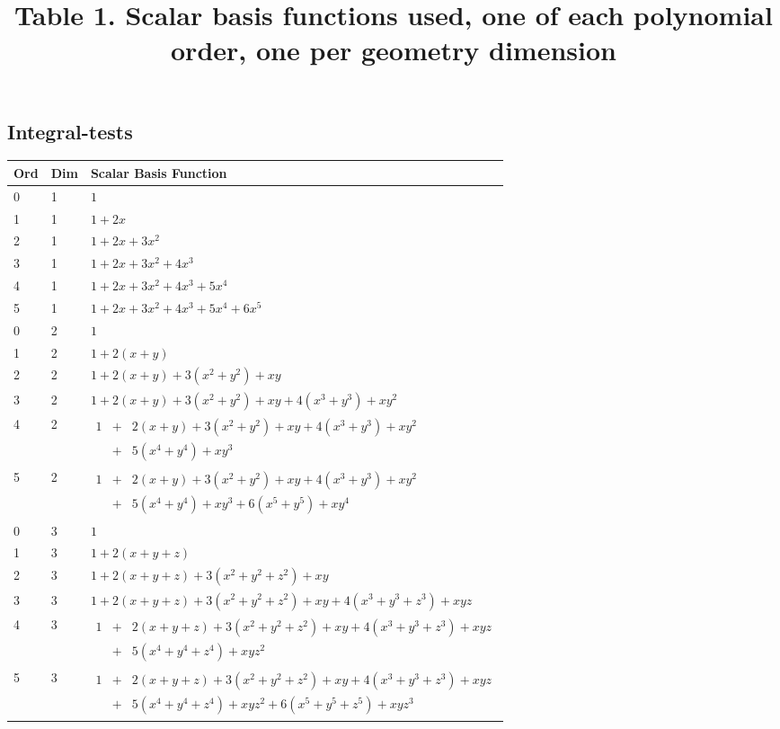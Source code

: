 \subsection{Integral-tests}

\begin{center}
\begin{tabular}{ | l | l | l |}
  \hline
  Ord & Dim & Scalar Basis Function \\ \hline
  0 & 1 & $1$ \\ \hline
  1 & 1 & $1 + 2x$ \\ \hline
  2 & 1 & $1 + 2x + 3x^2$ \\ \hline
  3 & 1 & $1 + 2x + 3x^2 + 4x^3$ \\ \hline
  4 & 1 & $1 + 2x + 3x^2 + 4x^3 + 5x^4$ \\ \hline
  5 & 1 & $1 + 2x + 3x^2 + 4x^3 + 5x^4 + 6x^5$ \\ \hline
  0 & 2 & $1$ \\ \hline
  1 & 2 & $1 + 2(x + y)$ \\ \hline
  2 & 2 & $1 + 2(x + y) + 3(x^2 + y^2) + xy$ \\ \hline
  3 & 2 & $1 + 2(x + y) + 3(x^2 + y^2) + xy + 4(x^3 + y^3) + xy^2$ \\ \hline
  4 & 2 & $\begin{array}{lcl} 1 & + & 2(x + y) + 3(x^2 + y^2) + xy + 4(x^3 + y^3) + xy^2 \\ & + & 5(x^4 + y^4) + xy^3 \end{array}$ \\ \hline
  5 & 2 & $\begin{array}{lcl} 1 & + & 2(x + y) + 3(x^2 + y^2) + xy + 4(x^3 + y^3) + xy^2 \\ & + & 5(x^4 + y^4) + xy^3 + 6(x^5 + y^5) + xy^4 \end{array}$ \\ \hline
  0 & 3 & $1$ \\ \hline
  1 & 3 & $1 + 2(x + y + z)$ \\ \hline
  2 & 3 & $1 + 2(x + y + z) + 3(x^2 + y^2 + z^2) + xy$ \\ \hline
  3 & 3 & $1 + 2(x + y + z) + 3(x^2 + y^2 + z^2) + xy + 4(x^3 + y^3 + z^3) + xyz$ \\ \hline
  4 & 3 & $\begin{array}{lcl} 1 & + & 2(x + y + z) + 3(x^2 + y^2 + z^2) + xy + 4(x^3 + y^3 + z^3) + xyz \\ & + & 5(x^4 + y^4 + z^4) + xyz^2 \end{array}$ \\ \hline
  5 & 3 & $\begin{array}{lcl} 1 & + & 2(x + y + z) + 3(x^2 + y^2 + z^2) + xy + 4(x^3 + y^3 + z^3) + xyz \\ & + & 5(x^4 + y^4 + z^4) + xyz^2 + 6(x^5 + y^5 + z^5) + xyz^3 \end{array}$ \\ \hline
\end{tabular}
\vfill
\title{Table 1. Scalar basis functions used, one of each polynomial order, one per geometry dimension}
\end{center}

